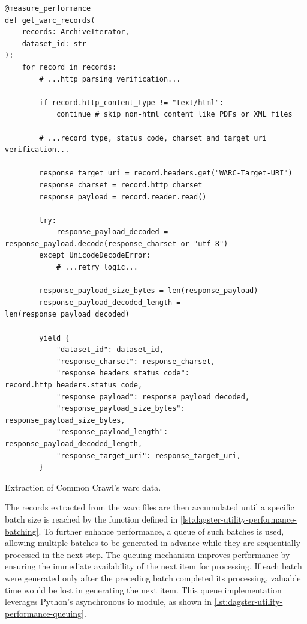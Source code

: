 \begin{listing}[H]
\begin{verbatim}
@measure_performance
def get_warc_records(
    records: ArchiveIterator,
    dataset_id: str
):
    for record in records:
        # ...http parsing verification...

        if record.http_content_type != "text/html":
            continue # skip non-html content like PDFs or XML files

        # ...record type, status code, charset and target uri verification...

        response_target_uri = record.headers.get("WARC-Target-URI")
        response_charset = record.http_charset
        response_payload = record.reader.read()

        try:
            response_payload_decoded = response_payload.decode(response_charset or "utf-8")
        except UnicodeDecodeError:
            # ...retry logic...

        response_payload_size_bytes = len(response_payload)
        response_payload_decoded_length = len(response_payload_decoded)

        yield {
            "dataset_id": dataset_id,
            "response_charset": response_charset,
            "response_headers_status_code": record.http_headers.status_code,
            "response_payload": response_payload_decoded,
            "response_payload_size_bytes": response_payload_size_bytes,
            "response_payload_length": response_payload_decoded_length,
            "response_target_uri": response_target_uri,
        }
\end{verbatim}
\caption{Extraction of Common Crawl's \ac{warc} data.}
\label{lst:dagster-source-common-crawl-warc}
\end{listing}

The records extracted from the \ac{warc} files are then accumulated until a specific batch size is reached by the function defined in \cref{lst:dagster-utility-performance-batching}.
To further enhance performance, a queue of such batches is used, allowing multiple batches to be generated in advance while they are sequentially processed in the next step.
The queuing mechanism improves performance by ensuring the immediate availability of the next item for processing.
If each batch were generated only after the preceding batch completed its processing, valuable time would be lost in generating the next item.
This queue implementation leverages Python's asynchronous \ac{io} module, as shown in \cref{lst:dagster-utility-performance-queuing}.

